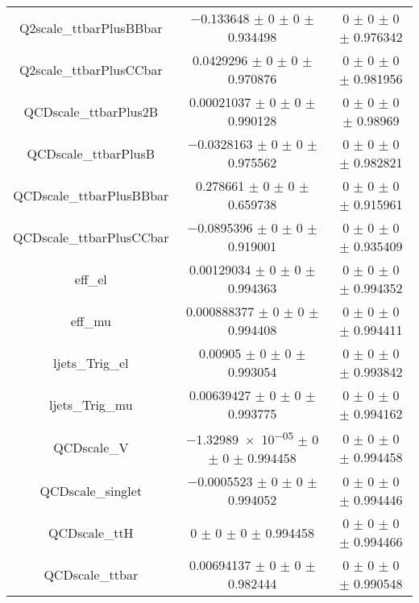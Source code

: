 \begin{table}
\begin{tabular}{ccc}
Q2scale\_ttbarPlusBBbar & \num{-0.133648} $\pm$ \num{0} $\pm$ \num{0} $\pm$ \num{0.934498} & \num{0} $\pm$ \num{0} $\pm$ \num{0} $\pm$ \num{0.976342}\\
Q2scale\_ttbarPlusCCbar & \num{0.0429296} $\pm$ \num{0} $\pm$ \num{0} $\pm$ \num{0.970876} & \num{0} $\pm$ \num{0} $\pm$ \num{0} $\pm$ \num{0.981956}\\
QCDscale\_ttbarPlus2B & \num{0.00021037} $\pm$ \num{0} $\pm$ \num{0} $\pm$ \num{0.990128} & \num{0} $\pm$ \num{0} $\pm$ \num{0} $\pm$ \num{0.98969}\\
QCDscale\_ttbarPlusB & \num{-0.0328163} $\pm$ \num{0} $\pm$ \num{0} $\pm$ \num{0.975562} & \num{0} $\pm$ \num{0} $\pm$ \num{0} $\pm$ \num{0.982821}\\
QCDscale\_ttbarPlusBBbar & \num{0.278661} $\pm$ \num{0} $\pm$ \num{0} $\pm$ \num{0.659738} & \num{0} $\pm$ \num{0} $\pm$ \num{0} $\pm$ \num{0.915961}\\
QCDscale\_ttbarPlusCCbar & \num{-0.0895396} $\pm$ \num{0} $\pm$ \num{0} $\pm$ \num{0.919001} & \num{0} $\pm$ \num{0} $\pm$ \num{0} $\pm$ \num{0.935409}\\
eff\_el & \num{0.00129034} $\pm$ \num{0} $\pm$ \num{0} $\pm$ \num{0.994363} & \num{0} $\pm$ \num{0} $\pm$ \num{0} $\pm$ \num{0.994352}\\
eff\_mu & \num{0.000888377} $\pm$ \num{0} $\pm$ \num{0} $\pm$ \num{0.994408} & \num{0} $\pm$ \num{0} $\pm$ \num{0} $\pm$ \num{0.994411}\\
ljets\_Trig\_el & \num{0.00905} $\pm$ \num{0} $\pm$ \num{0} $\pm$ \num{0.993054} & \num{0} $\pm$ \num{0} $\pm$ \num{0} $\pm$ \num{0.993842}\\
ljets\_Trig\_mu & \num{0.00639427} $\pm$ \num{0} $\pm$ \num{0} $\pm$ \num{0.993775} & \num{0} $\pm$ \num{0} $\pm$ \num{0} $\pm$ \num{0.994162}\\
QCDscale\_V & \num{-1.32989e-05} $\pm$ \num{0} $\pm$ \num{0} $\pm$ \num{0.994458} & \num{0} $\pm$ \num{0} $\pm$ \num{0} $\pm$ \num{0.994458}\\
QCDscale\_singlet & \num{-0.0005523} $\pm$ \num{0} $\pm$ \num{0} $\pm$ \num{0.994052} & \num{0} $\pm$ \num{0} $\pm$ \num{0} $\pm$ \num{0.994446}\\
QCDscale\_ttH & \num{0} $\pm$ \num{0} $\pm$ \num{0} $\pm$ \num{0.994458} & \num{0} $\pm$ \num{0} $\pm$ \num{0} $\pm$ \num{0.994466}\\
QCDscale\_ttbar & \num{0.00694137} $\pm$ \num{0} $\pm$ \num{0} $\pm$ \num{0.982444} & \num{0} $\pm$ \num{0} $\pm$ \num{0} $\pm$ \num{0.990548}\\

\end{tabular}
\end{table}
